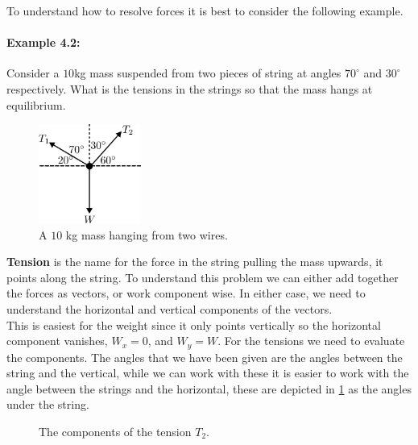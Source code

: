 \documentclass[a4paper,12pt]{book}
\begin{document}
To understand how to resolve forces it is best to consider the following example.
\paragraph{Example 4.2:} Consider a $10$kg mass suspended from two pieces of string at angles $70^{\circ}$ and $30^{\circ}$ respectively.  What is the tensions in the strings so that the mass hangs at equilibrium.
\begin{figure}[ht]
    \centering
    \includegraphics[width=0.3\textwidth]{figures/hanging_mass.png}
    \caption{A $10$ kg mass hanging from two wires.}
    \label{fig: hanging mass}
\end{figure}
\textbf{Tension} is the name for the force in the string pulling the mass upwards, it points along the string.  To understand this problem we can either add together the forces as vectors, or work component wise. In either case, we need to understand the horizontal and vertical components of the vectors.\\

This is easiest for the weight since it only points vertically so the horizontal component vanishes, $W_{x}=0$, and $W_{y}=W$. For the tensions we need to evaluate the components. The angles that we have been given are the angles between the string and the vertical, while we can work with these it is easier to work with the angle between the strings and the horizontal, these are depicted in \cref{fig: hanging mass} as the angles under the string.

\begin{figure}[ht]
    \centering
    \caption{The components of the tension $T_{2}$.}
    \label{fig: Tension components}
\end{figure}
\end{document}

